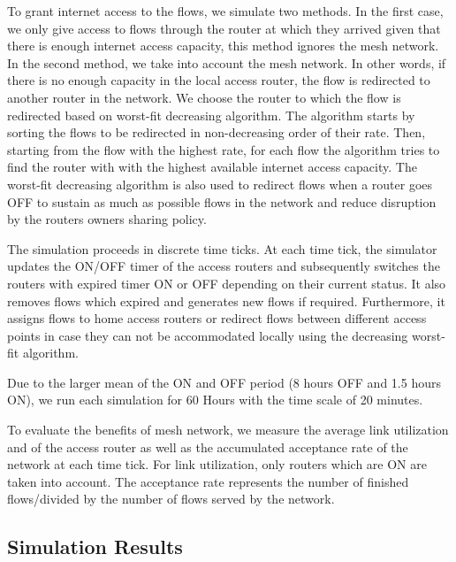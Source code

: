 To grant internet access to the flows, we simulate two methods. In the first case, we only give access to flows through the router at which they arrived given that there is enough internet access capacity, this method ignores the mesh network. In the second method, we take into account the mesh network. In other words, if there is no enough capacity in the local access router, the flow is redirected to another router in the network. We choose the router to which the flow is redirected based on worst-fit decreasing algorithm. The algorithm starts by sorting the flows to be redirected in non-decreasing order of their rate. Then, starting from the flow with the highest rate, for each flow the algorithm tries to find the router with with the highest available internet access capacity. The worst-fit decreasing algorithm is also used to redirect flows when a router goes OFF to sustain as much as possible flows in the network and reduce disruption by the routers owners sharing policy.

The simulation proceeds in discrete time ticks. At each time tick, the simulator updates the ON/OFF timer of the access routers and subsequently switches the routers with expired timer ON or OFF depending on their current status. It also removes flows which expired and generates new flows if required. Furthermore, it assigns flows to home access routers or redirect flows between different access points in case they can not be accommodated locally using the decreasing worst-fit algorithm. 

Due to the larger mean of the ON and OFF period (8 hours OFF and 1.5 hours ON), we run each simulation for 60 Hours with the time scale of 20 minutes. 

To evaluate the benefits of mesh network, we measure the average link utilization and of the access router as well as the accumulated acceptance rate of the network at each time tick.  For link utilization, only routers which are ON are taken into account. The acceptance rate represents the number of finished flows/divided by the number of flows served by the network. 

 
\subsection{Simulation Results}
 
